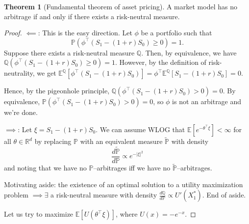 \documentclass{article}
\theoremstyle{definition}
\newtheorem{theorem}{Theorem}[section]
\begin{document}
\begin{theorem}[Fundamental theorem of asset pricing]
    A market model has no arbitrage if and only if there exists a risk-neutral measure.
\end{theorem}
\begin{proof}
    $\impliedby$: This is the easy direction. Let $\phi$ be a portfolio such that \[
    \mathbb{P}(\phi^\top(S_1-(1+r)S_0)\ge 0)=1.
    \]
    Suppose there exists a risk-neutral measure $\mathbb{Q}$. Then, by equivalence, we have $\mathbb{Q}(\phi^\top(S_1-(1+r)S_0)\ge 0)=1$. However, by the definition of risk-neutrality, we get $\mathbb{E}^\mathbb{Q}[\phi^\top(S_1-(1+r)S_0)]=\phi^\top \mathbb{E}^{\mathbb{Q}}[S_1-(1+r)S_0] = 0$.

    Hence, by the pigeonhole principle, $\mathbb{Q}(\phi^\top(S_1-(1+r)S_0)>0)=0$. By equivalence, $\mathbb{P}(\phi^\top(S_1-(1+r)S_0)>0)=0$, so $\phi$ is not an arbitrage and we're done.
    \vspace{1mm}
    
    
    $\implies$: Let $\xi = S_1 - (1+r)S_0$. We can assume WLOG that $\mathbb{E}[e^{-\theta^\top \xi}] < \infty$ for all $\theta \in \mathbb{R}^d$ by replacing $\mathbb{P}$ with an equivalent measure $\tilde{\mathbb{P}}$ with density \[
    \frac{d \tilde{\mathbb{P}}}{d \mathbb{P}} \propto e^{-|\xi|^2}
    \] 
    and noting that we have no $\mathbb{P}$--arbitrages iff we have no $\tilde{\mathbb{P}}$--arbitrages.
    \vspace{1mm}
    
    Motivating aside: the existence of an optimal solution to a utility maximization problem $\implies \exists$ a risk-neutral measure with density $\frac{d\mathbb{Q}}{d\mathbb{P}} \propto U'(X_1^*)$. End of aside.
    \vspace{1mm}
    
    Let us try to maximize $\mathbb{E}[U(\theta^\top \xi)]$, where $U(x)=-e^{-x}$. 
    

\end{proof}
\end{document}

